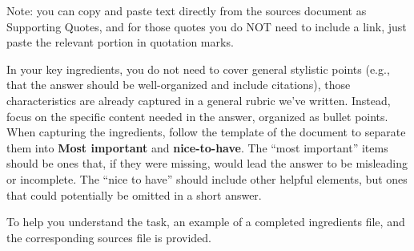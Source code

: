 \begin{table}[h!]
\begin{tcolorbox}
\begin{enumerate}
    Note: you can copy and paste text directly from the sources document as Supporting Quotes, and for those quotes you do NOT need to include a link, just paste the relevant portion in quotation marks.
\end{enumerate}


In your key ingredients, you do not need to cover general stylistic points (e.g., that the answer should be well-organized and include citations), those characteristics are already captured in a general rubric we’ve written.  Instead, focus on the specific content needed in the answer, organized as bullet points.  When capturing the ingredients, follow the template of the document to separate them into \textbf{Most important} and \textbf{nice-to-have}.  The ``most important'' items should be ones that, if they were missing, would lead the answer to be misleading or incomplete.  The ``nice to have'' should include other helpful elements, but ones that could potentially be omitted in a short answer.

To help you understand the task, an example of a completed ingredients file, and the corresponding sources file is provided.

\end{tcolorbox}
\caption{\label{tab:annotator instructions_cs} {\bf \textsc{ScholarQA-CS} annotation instructions}: Instructions given to our expert annotators for producing key ingredients for \textsc{ScholarQA-CS} questions.}
\end{table}


